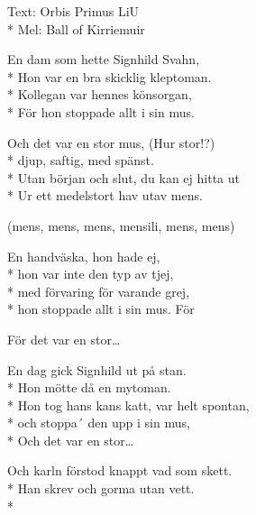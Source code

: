 \begin{SongText}
    \begin{SongInfo}
        Text: Orbis Primus LiU\\*%
        Mel: Ball of Kirriemuir
    \end{SongInfo}
    \begin{SongVerse}
        En dam som hette Signhild Svahn,\\*%
        Hon var en bra skicklig kleptoman.\\*%
        Kollegan var hennes könsorgan,\\*%
        För hon stoppade allt i sin mus.
    \end{SongVerse}
    \begin{SongVerse}
        Och det var en stor mus, (Hur stor!?)\\*%
        djup, saftig, med spänst.\\*%
        Utan början och slut, du kan ej hitta ut\\*%
        Ur ett medelstort hav utav mens.
    \end{SongVerse}
    \begin{SongVerse}
        (mens, mens, mens, mensili, mens, mens)
    \end{SongVerse}
    \begin{SongVerse}
        En handväska, hon hade ej,\\*%
        hon var inte den typ av tjej,\\*%
        med förvaring för varande grej,\\*%
        hon stoppade allt i sin mus. För
    \end{SongVerse}
    \begin{SongVerse}
        För det var en stor…
    \end{SongVerse}
    \begin{SongVerse}
        En dag gick Signhild ut på stan.\\*%
        Hon mötte då en mytoman.\\*%
        Hon tog hans kans katt, var helt spontan,\\*%
        och stoppa´ den upp i sin mus,\\*%
        Och det var en stor…
    \end{SongVerse}
    \begin{SongVerse}
        Och karln förstod knappt vad som skett.\\*%
        Han skrev och gorma utan vett.\\*%

\end{SongVerse}
\end{SongText}
